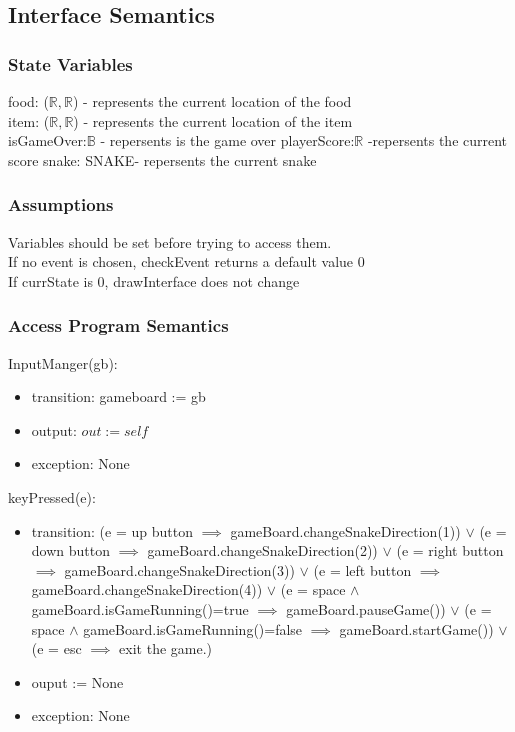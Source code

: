 \documentclass[12pt, titlepage]{article}
\begin{document}
		
		\subsection{Interface Semantics}
		\subsubsection{State Variables}
		food: ($\mathbb{R}, \mathbb{R}$) - represents the current location of the food\\
		item: ($\mathbb{R}, \mathbb{R}$) - represents the current location of the item\\
		isGameOver:$\mathbb{B}$ - repersents is the game over
		playerScore:$\mathbb{R}$ -repersents the current score
        snake: SNAKE- repersents the current snake
		
		\subsubsection{Assumptions}
		Variables should be set before trying to access them.\\
		If no event is chosen, checkEvent returns a default value 0\\
        If currState is 0, drawInterface does not change\\
        
		\subsubsection{Access Program Semantics}

		
	
InputManger(gb):
\begin{itemize}
\item transition: gameboard := gb
\item output: $\mathit{out} := \mathit{self}$
\item exception: None
\end{itemize}

\noindent keyPressed(e):
\begin{itemize}
\item transition: (e = up button $\implies$ gameBoard.changeSnakeDirection(1)) $\lor$ (e = down button $\implies$ gameBoard.changeSnakeDirection(2)) $\lor$ (e = right button $\implies$ gameBoard.changeSnakeDirection(3)) $\lor$ (e = left button $\implies$ gameBoard.changeSnakeDirection(4)) $\lor$ (e = space $\land$ gameBoard.isGameRunning()=true $\implies$ gameBoard.pauseGame()) $\lor$ (e = space $\land$ gameBoard.isGameRunning()=false $\implies$ gameBoard.startGame()) $\lor$ (e = esc $\implies$ exit the game.)
\item ouput := None
\item exception: None\\
\end{itemize}
\end{document}
